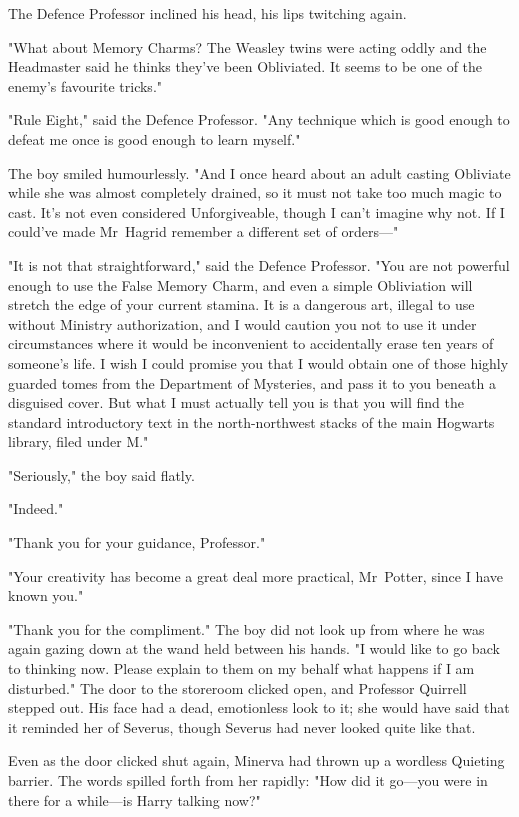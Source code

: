 The Defence Professor inclined his head, his lips twitching again.

"What about Memory Charms? The Weasley twins were acting oddly and the
Headmaster said he thinks they've been Obliviated. It seems to be one of the
enemy's favourite tricks."

"Rule Eight," said the Defence Professor. "Any technique which is good enough
to defeat me once is good enough to learn myself."

The boy smiled humourlessly. "And I once heard about an adult casting Obliviate
while she was almost completely drained, so it must not take too much magic to
cast. It's not even considered Unforgiveable, though I can't imagine why not.
If I could've made Mr~Hagrid remember a different set of orders---"

"It is not that straightforward," said the Defence Professor. "You are not
powerful enough to use the False Memory Charm, and even a simple Obliviation
will stretch the edge of your current stamina. It is a dangerous art, illegal
to use without Ministry authorization, and I would caution you not to use it
under circumstances where it would be inconvenient to accidentally erase ten
years of someone's life. I wish I could promise you that I would obtain one of
those highly guarded tomes from the Department of Mysteries, and pass it to you
beneath a disguised cover. But what I must actually tell you is that you will
find the standard introductory text in the north-northwest stacks of the main
Hogwarts library, filed under M."

"Seriously," the boy said flatly.

"Indeed."

"Thank you for your guidance, Professor."

"Your creativity has become a great deal more practical, Mr~Potter, since I
have known you."

"Thank you for the compliment." The boy did not look up from where he was again
gazing down at the wand held between his hands. "I would like to go back to
thinking now. Please explain to them on my behalf what happens if I am
disturbed."
\later
The door to the storeroom clicked open, and Professor Quirrell stepped out. His
face had a dead, emotionless look to it; she would have said that it reminded
her of Severus, though Severus had never looked quite like that.

Even as the door clicked shut again, Minerva had thrown up a wordless Quieting
barrier. The words spilled forth from her rapidly: "How did it go---you were in
there for a while---is Harry talking now?"

